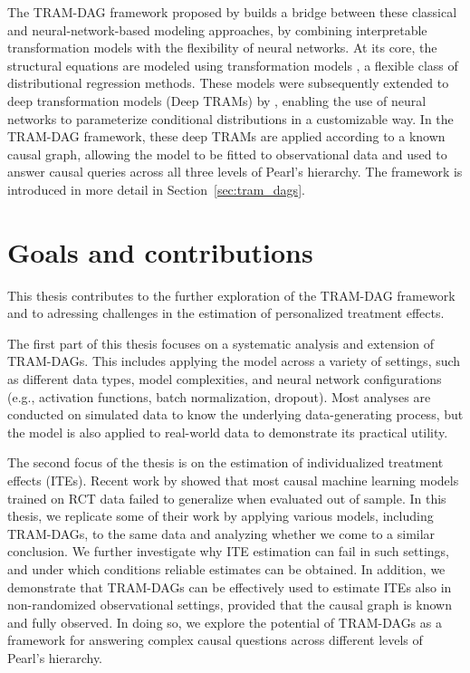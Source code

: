 The TRAM-DAG framework proposed by \citet{sick2025} builds a bridge between these classical and neural-network-based modeling approaches, by combining interpretable transformation models with the flexibility of neural networks. At its core, the structural equations are modeled using transformation models \citep{hothorn2014}, a flexible class of distributional regression methods. These models were subsequently extended to deep transformation models (Deep TRAMs) by \citet{sick2020}, enabling the use of neural networks to parameterize conditional distributions in a customizable way. In the TRAM-DAG framework, these deep TRAMs are applied according to a known causal graph, allowing the model to be fitted to observational data and used to answer causal queries across all three levels of Pearl's hierarchy. The framework is introduced in more detail in Section~\ref{sec:tram_dags}.





\section{Goals and contributions} \label{sec:goals_contributions}

This thesis contributes to the further exploration of the TRAM-DAG framework and to adressing challenges in the estimation of personalized treatment effects.

The first part of this thesis focuses on a systematic analysis and extension of TRAM-DAGs. This includes applying the model across a variety of settings, such as different data types, model complexities, and neural network configurations (e.g., activation functions, batch normalization, dropout). Most analyses are conducted on simulated data to know the underlying data-generating process, but the model is also applied to real-world data to demonstrate its practical utility.

The second focus of the thesis is on the estimation of individualized treatment effects (ITEs). Recent work by \citet{chen2025} showed that most causal machine learning models trained on RCT data failed to generalize when evaluated out of sample. In this thesis, we replicate some of their work by applying various models, including TRAM-DAGs, to the same data and analyzing whether we come to a similar conclusion. We further investigate why ITE estimation can fail in such settings, and under which conditions reliable estimates can be obtained. In addition, we demonstrate that TRAM-DAGs can be effectively used to estimate ITEs also in non-randomized observational settings, provided that the causal graph is known and fully observed. In doing so, we explore the potential of TRAM-DAGs as a framework for answering complex causal questions across different levels of Pearl's hierarchy.



